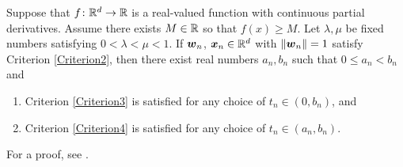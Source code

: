 \begin{theorem}[Wolfe]\label{theorem:Wolfe}
Suppose that $f \colon \mathbb{R}^d \to \mathbb{R}$ is a real-valued function with continuous partial derivatives.  Assume there exists $M \in \mathbb{R}$ so that $f(x) \geq M$.  Let $\lambda, \mu$ be fixed numbers satisfying $0 < \lambda < \mu < 1$.  If $\boldsymbol{w}_n$, $\boldsymbol{x}_n \in \mathbb{R}^d$ with $\lVert \boldsymbol{w}_n \rVert = 1$ satisfy Criterion \eqref{Criterion2}, then there exist real numbers $a_n, b_n$ such that $0 \leq a_n < b_n$ and
\begin{enumerate}
	\item Criterion \eqref{Criterion3} is satisfied for any choice of $t_n \in (0, b_n)$, and
	\item Criterion \eqref{Criterion4} is satisfied for any choice of $t_n \in (a_n, b_n)$.
\end{enumerate}
\end{theorem}

\begin{remark}
For a proof, see \cite[Theorem 3.3.1]{peressini1988mathematics}.
\end{remark}



